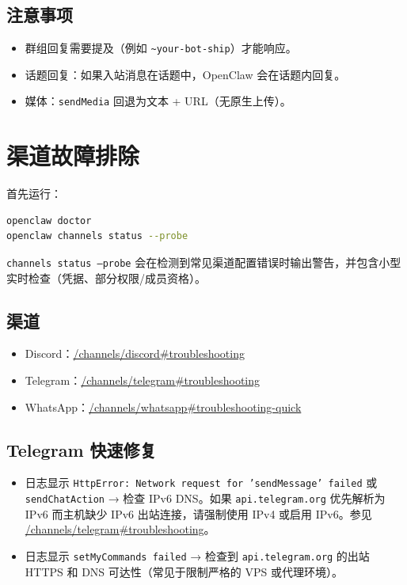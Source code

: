 \subsection{注意事项}


\begin{itemize}
  \item 群组回复需要提及（例如 \texttt{\textasciitilde{}your-bot-ship}）才能响应。
  \item 话题回复：如果入站消息在话题中，OpenClaw 会在话题内回复。
  \item 媒体：\texttt{sendMedia} 回退为文本 + URL（无原生上传）。
\end{itemize}



\clearpage

\section{渠道故障排除}


首先运行：

\begin{lstlisting}[language=bash]
openclaw doctor
openclaw channels status --probe
\end{lstlisting}


\texttt{channels status --probe} 会在检测到常见渠道配置错误时输出警告，并包含小型实时检查（凭据、部分权限/成员资格）。

\subsection{渠道}


\begin{itemize}
  \item Discord：\href{/channels/discord\#troubleshooting}{/channels/discord\#troubleshooting}
  \item Telegram：\href{/channels/telegram\#troubleshooting}{/channels/telegram\#troubleshooting}
  \item WhatsApp：\href{/channels/whatsapp\#troubleshooting-quick}{/channels/whatsapp\#troubleshooting-quick}
\end{itemize}


\subsection{Telegram 快速修复}


\begin{itemize}
  \item 日志显示 \texttt{HttpError: Network request for 'sendMessage' failed} 或 \texttt{sendChatAction} → 检查 IPv6 DNS。如果 \texttt{api.telegram.org} 优先解析为 IPv6 而主机缺少 IPv6 出站连接，请强制使用 IPv4 或启用 IPv6。参见 \href{/channels/telegram\#troubleshooting}{/channels/telegram\#troubleshooting}。
  \item 日志显示 \texttt{setMyCommands failed} → 检查到 \texttt{api.telegram.org} 的出站 HTTPS 和 DNS 可达性（常见于限制严格的 VPS 或代理环境）。
\end{itemize}



